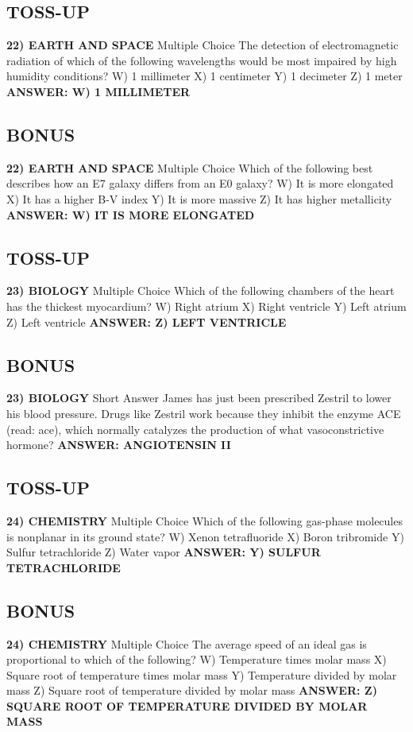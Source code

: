 \documentclass{article}
\begin{document}
\newpage

\subsection*{TOSS-UP}
\textbf{22) EARTH AND SPACE}
Multiple Choice The detection of electromagnetic radiation of which of the following wavelengths would be most impaired by high humidity conditions?
W) 1 millimeter
X) 1 centimeter
Y) 1 decimeter
Z) 1 meter
\textbf{ANSWER: W) 1 MILLIMETER}

\subsection*{BONUS}
\textbf{22) EARTH AND SPACE}
Multiple Choice Which of the following best describes how an E7 galaxy differs from an E0 galaxy?
W) It is more elongated
X) It has a higher B-V index
Y) It is more massive
Z) It has higher metallicity
\textbf{ANSWER: W) IT IS MORE ELONGATED}

\subsection*{TOSS-UP}
\textbf{23) BIOLOGY}
Multiple Choice Which of the following chambers of the heart has the thickest myocardium?
W) Right atrium
X) Right ventricle
Y) Left atrium
Z) Left ventricle
\textbf{ANSWER: Z) LEFT VENTRICLE}

\subsection*{BONUS}
\textbf{23) BIOLOGY}
Short Answer James has just been prescribed Zestril to lower his blood pressure.
Drugs like Zestril work because they inhibit the enzyme ACE (read: ace), which normally catalyzes the production of what vasoconstrictive hormone?
\textbf{ANSWER: ANGIOTENSIN II}

\newpage

\subsection*{TOSS-UP}
\textbf{24) CHEMISTRY}
Multiple Choice Which of the following gas-phase molecules is nonplanar in its ground state?
W) Xenon tetrafluoride
X) Boron tribromide
Y) Sulfur tetrachloride
Z) Water vapor
\textbf{ANSWER: Y) SULFUR TETRACHLORIDE}

\subsection*{BONUS}
\textbf{24) CHEMISTRY}
Multiple Choice The average speed of an ideal gas is proportional to which of the following?
W) Temperature times molar mass
X) Square root of temperature times molar mass
Y) Temperature divided by molar mass
Z) Square root of temperature divided by molar mass
\textbf{ANSWER: Z) SQUARE ROOT OF TEMPERATURE DIVIDED BY MOLAR MASS}
\end{document}
